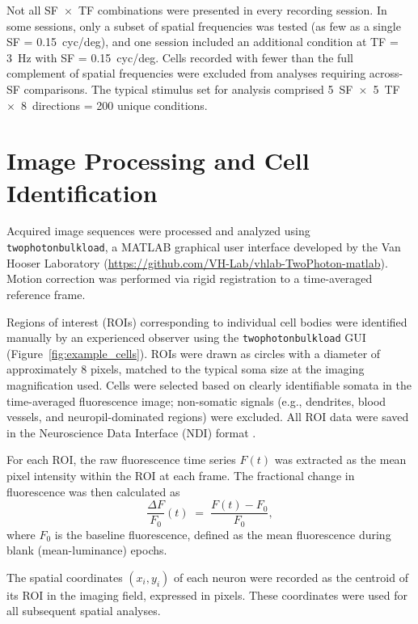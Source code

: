 \documentclass{brandeis-thesis3.3}
\begin{document}
Not all SF~$\times$~TF combinations were presented in every
recording session. In some sessions, only a subset of spatial
frequencies was tested (as few as a single SF =
0.15~cyc/deg), and one session included an additional
condition at TF = 3~Hz with SF = 0.15~cyc/deg. Cells recorded
with fewer than the full complement of spatial frequencies
were excluded from analyses requiring across-SF comparisons.
The typical stimulus set for analysis comprised
5~SF~$\times$~5~TF~$\times$~8~directions = 200 unique
conditions.



\section{Image Processing and Cell Identification}
\label{sec:image_processing}

Acquired image sequences were processed and analyzed using
\texttt{twophotonbulkload}, a MATLAB graphical user interface
developed by the Van Hooser Laboratory
(\url{https://github.com/VH-Lab/vhlab-TwoPhoton-matlab}).
Motion correction was performed via rigid registration to a
time-averaged reference frame.

Regions of interest (ROIs) corresponding to individual cell
bodies were identified manually by an experienced observer
using the \texttt{twophotonbulkload} GUI
(Figure~\ref{fig:example_cells}). ROIs were drawn as circles
with a diameter of approximately 8 pixels, matched to the
typical soma size at the imaging magnification used. Cells
were selected based on clearly identifiable somata in the
time-averaged fluorescence image; non-somatic signals (e.g.,
dendrites, blood vessels, and neuropil-dominated regions)
were excluded. All ROI data were saved in the Neuroscience
Data Interface (NDI) format \citep{GarciaMurillo2022}.

For each ROI, the raw fluorescence time series $F(t)$ was
extracted as the mean pixel intensity within the ROI at each
frame. The fractional change in fluorescence was then
calculated as
%
\begin{equation}
  \frac{\Delta F}{F_0}(t) \;=\;
    \frac{F(t) - F_0}{F_0},
  \label{eq:dff}
\end{equation}
%
where $F_0$ is the baseline fluorescence, defined as the
mean fluorescence during blank (mean-luminance) epochs.

The spatial coordinates $(x_i, y_i)$ of each neuron were
recorded as the centroid of its ROI in the imaging field,
expressed in pixels. These coordinates were used for all
subsequent spatial analyses.
\end{document}
